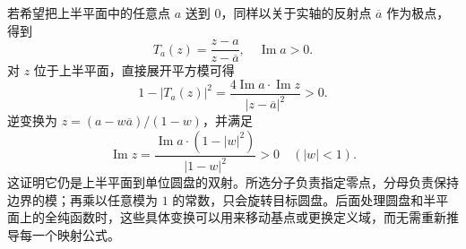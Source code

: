 \ProseParagraphBreak

若希望把上半平面中的任意点 \(a\) 送到 \(0\)，同样以关于实轴的反射点 \(\overline a\) 作为极点，得到
\[
 T_a(z)=\frac{z-a}{z-\overline a},
 \quad \operatorname{Im}a>0.
\]
对 \(z\) 位于上半平面，直接展开平方模可得
\[
 1-|T_a(z)|^2
 =\frac{4\operatorname{Im}a\cdot\operatorname{Im}z}
 {|z-\overline a|^2}>0.
\]
逆变换为 \(z=(a-w\overline a)/(1-w)\)，并满足
\[
 \operatorname{Im}z
 =\frac{\operatorname{Im}a\cdot(1-|w|^2)}{|1-w|^2}>0
 \quad(|w|<1).
\]
这证明它仍是上半平面到单位圆盘的双射。所选分子负责指定零点，分母负责保持边界的模；再乘以任意模为 \(1\) 的常数，只会旋转目标圆盘。后面处理圆盘和半平面上的全纯函数时，这些具体变换可以用来移动基点或更换定义域，而无需重新推导每一个映射公式。
